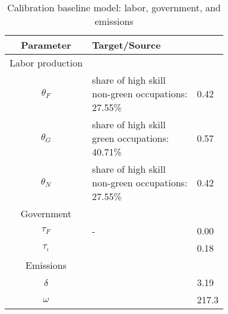   \begin{table}[hh!!!!!]
  	\begin{center}
  		\captionsetup{width=0.9\textwidth}
  		\caption{ Calibration baseline model: labor, government, and emissions}
  		\label{tab:calib2}
  		\begin{tabular}{c|ll}
  			\hline \hline
  			Parameter& Target/Source& \makecell[l]{Calibration}\\ 
  			\hline
  			\hline
  			Labor production&\multicolumn{2}{c}{}\\
  			\hline 
  			
  			\hline
  			$\theta_F$&\makecell[l]{share of high skill\\ non-green occupations: \\27.55\% \citep{Consoli2016DoCapital} }&0.42\\
  			$\theta_G$&\makecell[l]{share of high skill\\ green occupations: \\40.71\% \citep{Consoli2016DoCapital}}&0.57 \\
  			$\theta_N$&\makecell[l]{share of high skill\\ non-green occupations: \\27.55\% \citep{Consoli2016DoCapital} }&0.42\\
  			\hline
  			\hline
  			Government&\multicolumn{2}{c}{}\\
  			\hline
  			
  			\hline
  			$\tau_F$&- &0.00\\
  			$\tau_\iota$&\cite{Heathcote2017OptimalFramework} &0.18\\
  			\hline	
  			\hline
  			Emissions&\multicolumn{2}{c}{}\\
  			\hline
  			
  			\hline
  			$\delta$& \makecell[l]{\citep{EPAems}}&3.19\\
  			$\omega$& \citep{EPAems}&217.3\\
  			\hline \hline
  		\end{tabular}
  	\end{center}
  \end{table}

